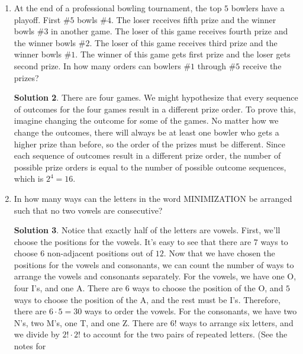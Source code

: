 \documentclass[twocolumn]{article}
\theoremstyle{definition}
\newtheorem*{solution}{Solution}
\begin{document}
\begin{enumerate}
\begin{solution}
        \end{solution}
    \item At the end of a professional bowling tournament, the top $5$ bowlers 
        have a playoff. First \#$5$ bowls \#$4$. The loser receives fifth prize 
        and the winner bowls \#$3$ in another game. The loser of this game 
        receives fourth prize and the winner bowls \#$2$. The loser of this game 
        receives third prize and the winner bowls \#$1$. The winner of this game 
        gets first prize and the loser gets second prize. In how many orders can 
        bowlers \#$1$ through \#$5$ receive the prizes?
        \begin{solution}
            There are four games. We might hypothesize that every sequence of 
            outcomes for the four games result in a different prize order. To 
            prove this, imagine changing the outcome for some of the games. No 
            matter how we change the outcomes, there will always be at least one 
            bowler who gets a higher prize than before, so the order of the 
            prizes must be different. Since each sequence of outcomes result in 
            a different prize order, the number of possible prize orders is 
            equal to the number of possible outcome sequences, which is $2^4 = 
            16$.
        \end{solution}
    \item In how many ways can the letters in the word MINIMIZATION be arranged 
        such that no two vowels are consecutive?
        \begin{solution}
            Notice that exactly half of the letters are vowels. First, we'll 
            choose the positions for the vowels. It's easy to see that there are 
            $7$ ways to choose $6$ non-adjacent positions out of $12$. Now that 
            we have chosen the positions for the vowels and consonants, we can 
            count the number of ways to arrange the vowels and consonants 
            separately. For the vowels, we have one O, four I's, and one A. 
            There are $6$ ways to choose the position of the O, and $5$ ways to 
            choose the position of the A, and the rest must be I's. Therefore, 
            there are $6 \cdot 5 = 30$ ways to order the vowels. For the 
            consonants, we have two N's, two M's, one T, and one Z. There are 
            $6!$ ways to arrange six letters, and we divide by $2! \cdot 2!$ to 
            account for the two pairs of repeated letters. (See the notes for 

\end{solution}
\end{enumerate}
\end{document}
